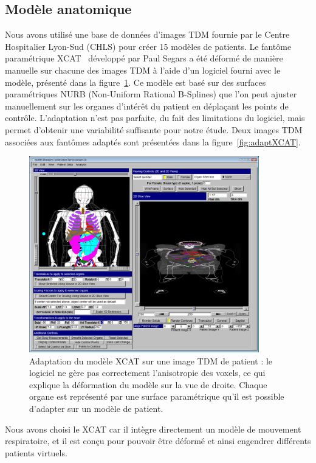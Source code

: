 \subsection{Modèle anatomique}

Nous avons utilisé une base de données d’images TDM fournie par le Centre Hospitalier Lyon-Sud (CHLS) pour créer 15 modèles de patients. Le fantôme paramétrique XCAT~\cite{segars2009mcatoverview} développé par Paul Segars a été déformé de manière manuelle sur chacune des images TDM à l’aide d’un logiciel fourni avec le modèle, présenté dans la figure~\ref{fig:fitXCAT}. Ce modèle est basé sur des surfaces paramétriques NURB (Non-Uniform Rational B-Splines) que l'on peut ajuster manuellement sur les organes d'intérêt du patient en déplaçant les points de contrôle. L'adaptation n’est pas parfaite, du fait des limitations du logiciel, mais permet d’obtenir une variabilité suffisante pour notre étude. Deux images TDM associées aux fantômes adaptés sont présentées dans la figure~\ref{fig:adaptXCAT}.

\begin{figure}
 \centering
 \includegraphics[width=10cm]{images/FIT_XCAT}
 \caption[Adaptation du modèle XCAT sur une image TDM de patient]{Adaptation du modèle XCAT sur une image TDM de patient : le logiciel ne gère pas correctement l'anisotropie des voxels, ce qui explique la déformation du modèle sur la vue de droite. Chaque organe est représenté par une surface paramétrique qu’il est possible d’adapter sur un modèle de patient.}
 \label{fig:fitXCAT}
\end{figure}

Nous avons choisi le XCAT car il intègre directement un modèle de mouvement respiratoire, et il est conçu pour pouvoir être déformé et ainsi engendrer différents patients virtuels.

